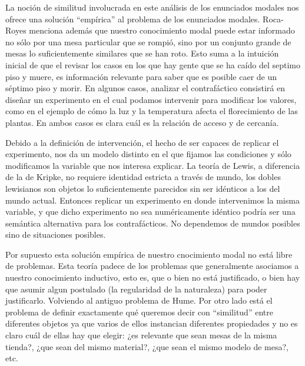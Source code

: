 La noción de similitud involucrada en este análisis de los enunciados modales nos ofrece una solución ``empírica'' al problema de los enunciados modales. Roca-Royes menciona además que nuestro conocimiento modal puede estar informado no sólo por una mesa particular que se rompió, sino por un conjunto grande de mesas lo suficientemente similares que se han roto. Esto suma a la intuición inicial de que el revisar los casos en los que hay gente que se ha caído del septimo piso y muere, es información relevante para saber que es posible caer de un séptimo piso y morir. En algunos casos, analizar el contrafáctico consistirá en diseñar un experimento en el cual podamos intervenir para modificar los valores, como en el ejemplo de cómo la luz y la temperatura afecta el florecimiento de las plantas. En ambos casos es clara cuál es la relación de acceso y de cercanía.

Debido a la definición de intervención, el hecho de ser capaces de replicar el experimento, nos da un modelo distinto en el que fijamos las condiciones y sólo modificamos la variable que nos interesa explicar. La teoría de Lewis, a diferencia de la de Kripke, no requiere identidad estricta a través de mundo, los dobles lewisianos son objetos lo suficientemente parecidos sin ser idénticos a los del mundo actual. Entonces replicar un experimento en donde intervenimos la misma variable, y que dicho experimento no sea numéricamente idéntico podría ser una semántica alternativa para los contrafácticos. No dependemos de mundos posibles sino de situaciones posibles.

Por supuesto esta solución empírica de nuestro cnocimiento modal no está libre de problemas. Esta teoría padece de los problemas que generalmente asociamos a nuestro conocimiento inductivo, esto es, que o bien no está justificado, o bien hay que asumir algun postulado (la regularidad de la naturaleza) para poder justificarlo. Volviendo al antiguo problema de Hume. Por otro lado está el problema de definir exactamente qué queremos decir con ``similitud'' entre diferentes objetos ya que varios de ellos instancian diferentes propiedades y no es claro cuál de ellas hay que elegir: ¿es relevante que sean mesas de la misma tienda?, ¿que sean del mismo material?, ¿que sean el mismo modelo de mesa?, etc.


